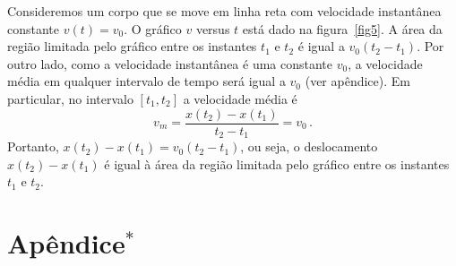 \documentclass[fontsize=12pt]{scrartcl}
\begin{document}
Consideremos um corpo que se move em linha reta com velocidade instantânea constante $v(t)=v_0$. O gráfico $v$ versus $t$ está dado na figura~\ref{fig5}. A área da região limitada pelo gráfico entre os instantes $t_1$ e $t_2$ é igual a $v_0(t_2-t_1)$. Por outro lado, como a velocidade instantânea é uma constante $v_0$, a velocidade média em qualquer intervalo de tempo será igual a $v_0$ (ver apêndice). Em particular, no intervalo $[t_1,t_2]$ a velocidade média é
$$v_m=\frac{x(t_2)-x(t_1)}{t_2-t_1}=v_0\,.$$
Portanto, $x(t_2)-x(t_1)=v_0(t_2-t_1)$, ou seja, o deslocamento $x(t_2)-x(t_1)$ é igual à área da região limitada pelo gráfico entre os instantes $t_1$ e $t_2$.



\section*{Apêndice$^*$}
\end{document}
